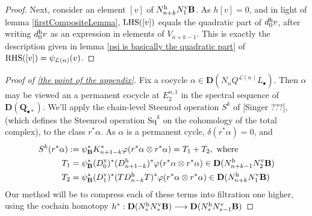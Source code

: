 \documentclass[11pt]{amsart}
\theoremstyle{plain}
\theoremstyle{definition}
\let\oldphi\phi
\let\phi\varphi
\renewcommand{\to}{\longrightarrow}
\newcommand{\calL}{\mathcal{L}}
\theoremstyle{plain}
\newcommand{\Sq}{\mathrm{Sq}}
\newcommand{\dual}{\mathbf{D}}
\begin{document}
\begin{appendices}
\begin{proof}
Next, consider an element $[v]$ of $N_{n+k}^\textup{h}N_1^\textup{v}\textbf{B}$. As $h[v]=0$, and in light of lemma \ref{firstCompositeLemma}, $\textup{LHS}([v])$ equals the quadratic part of $d_0^\textup{h}v$, after writing $d_0^\textup{h}v$ as an expression in elements of $V_{n+k-1}$. This is exactly the description given in lemma \ref{psi is basically the quadratic part} of $\textup{RHS}([v])=\psi_{\calL(n)}(v)$.
\end{proof}
\begin{proof}[Proof of \ref{the point of the appendix}]
Fix a cocycle $\alpha\in \dual(N_{n}Q^{\calL(n)} L_\bullet)$. %
Then $\alpha$ may be viewed an a permanent cocycle at $E_2^{n,1}$ in the spectral sequence of $\dual(\textbf{Q}_{\bullet*})$. We'll apply the chain-level Steenrod operation $S^k$ of [Singer ???], (which defines the Steenrod operation $\Sq^k$ on the cohomology of the total complex), to the class $r^*\alpha$. As $\alpha$ is a permanent cycle, $\delta(r^*\alpha)=0$, and
\begin{alignat*}{2}
S^k(r^*\alpha):={}&\psi_{\textup{\textbf{B}}}^*K^*_{n+1-k}\oldphi(r^*\alpha\otimes r^*\alpha)=T_1+T_2,\textup{ where}
\\
T_1
={}&
\psi_{\textup{\textbf{B}}}^*(D^\textup{v}_0)^*(D^\textup{h}_{n+1-k})^*
\oldphi(r^*\alpha\otimes r^*\alpha)\in \dual(N^\textup{h}_{n+k-1}N^\textup{v}_2\textbf{B})%
\\
T_2
={}&
\psi_{\textup{\textbf{B}}}^*(D^\textup{v}_1)^*(TD^\textup{h}_{n-k}T)^*
\oldphi(r^*\alpha\otimes r^*\alpha)\in \dual(N^\textup{h}_{n+k}N^\textup{v}_1\textbf{B})
\end{alignat*}
%
Our method will be to compress each of these terms into filtration one higher, using the cochain homotopy $h^*:\dual(N^\textup{h}_* N^\textup{v}_*\textbf{B})\to \dual(N^\textup{h}_*N^\textup{v}_{*-1}\textbf{B})$

\end{proof}
\end{appendices}
\end{document}
